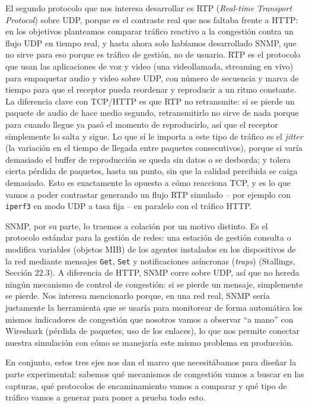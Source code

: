 \documentclass[11pt,a4paper]{article}
\begin{document}
El segundo protocolo que nos interesa desarrollar es RTP (\textit{Real-time Transport Protocol}) sobre UDP, porque es el contraste real que nos faltaba frente a HTTP: en los objetivos planteamos comparar tr\'afico reactivo a la congesti\'on contra un flujo UDP en tiempo real, y hasta ahora solo hab\'iamos desarrollado SNMP, que no sirve para eso porque es tr\'afico de gesti\'on, no de usuario. RTP es el protocolo que usan las aplicaciones de voz y video (una videollamada, streaming en vivo) para empaquetar audio y video sobre UDP, con n\'umero de secuencia y marca de tiempo para que el receptor pueda reordenar y reproducir a un ritmo constante. La diferencia clave con TCP/HTTP es que RTP no retransmite: si se pierde un paquete de audio de hace medio segundo, retransmitirlo no sirve de nada porque para cuando llegue ya pas\'o el momento de reproducirlo, as\'i que el receptor simplemente lo salta y sigue. Lo que s\'i le importa a este tipo de tr\'afico es el \textit{jitter} (la variaci\'on en el tiempo de llegada entre paquetes consecutivos), porque si var\'ia demasiado el buffer de reproducci\'on se queda sin datos o se desborda; y tolera cierta p\'erdida de paquetes, hasta un punto, sin que la calidad percibida se caiga demasiado. Esto es exactamente lo opuesto a c\'omo reacciona TCP, y es lo que vamos a poder contrastar generando un flujo RTP simulado -- por ejemplo con \texttt{iperf3} en modo UDP a tasa fija -- en paralelo con el tr\'afico HTTP.

SNMP, por su parte, lo traemos a colaci\'on por un motivo distinto. Es el protocolo est\'andar para la gesti\'on de redes: una estaci\'on de gesti\'on consulta o modifica variables (objetos MIB) de los agentes instalados en los dispositivos de la red mediante mensajes \texttt{Get}, \texttt{Set} y notificaciones as\'incronas (\textit{traps}) (Stallings, Secci\'on 22.3). A diferencia de HTTP, SNMP corre sobre UDP, as\'i que no hereda ning\'un mecanismo de control de congesti\'on: si se pierde un mensaje, simplemente se pierde. Nos interesa mencionarlo porque, en una red real, SNMP ser\'ia justamente la herramienta que se usar\'ia para monitorear de forma autom\'atica los mismos indicadores de congesti\'on que nosotros vamos a observar ``a mano'' con Wireshark (p\'erdida de paquetes, uso de los enlaces), lo que nos permite conectar nuestra simulaci\'on con c\'omo se manejar\'ia este mismo problema en producci\'on.

En conjunto, estos tres ejes nos dan el marco que necesit\'abamos para dise\~nar la parte experimental: sabemos qu\'e mecanismos de congesti\'on vamos a buscar en las capturas, qu\'e protocolos de encaminamiento vamos a comparar y qu\'e tipo de tr\'afico vamos a generar para poner a prueba todo esto.
\end{document}
